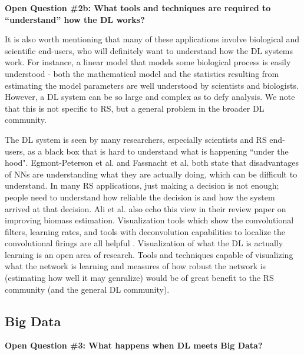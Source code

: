 \documentclass[12pt]{spieman}
\newcommand{\ParSection}[1]{}
\begin{document}
\begin{spacing}{1}
\textbf{Open Question \#2b: What tools and techniques are required to ``understand'' how the DL works?}
\ParSection{Human Understandable}

It is also worth mentioning that many of these applications involve biological and scientific end-users, who will definitely want to understand how the DL systems work. For instance, a linear model that models some biological process is easily understood - both the mathematical model and the statistics resulting from estimating the model parameters are well understood by scientists and biologists. However, a DL system can be so large and complex as to defy analysis. We note that this is not specific to RS, but a general problem in the broader DL community.

The DL system is seen by many researchers, especially scientists and RS end-users, as a black box that is hard to understand what is happening ``under the hood". Egmont-Peterson et al. \cite{Egmont-Petersen2002} and Fassnacht et al. \cite{fassnacht2016review} both state that disadvantages of NNs are understanding what they are actually doing, which can be difficult to understand. In many RS applications, just making a decision is not enough; people need to understand how reliable the decision is and how the system arrived at that decision. Ali et al. \cite{Ali2015} also echo this view in their review paper on improving biomass estimation. Visualization tools which show the convolutional filters, learning rates, and tools with deconvolution capabilities to localize the convolutional firings are all helpful \cite{mahendran2015understanding, yosinski2015understanding, zeiler2014visualizing, simonyan2013deep, erhan2009visualizing} . Visualization of what the DL is actually learning is an open area of research. Tools and techniques capable of visualizing what the network is learning and measures of how robust the network is (estimating how well it may genralize) would be of great benefit to the RS community (and the general DL community).


\subsection{Big Data}
\label{subsec:ChallengesOpportunities_iii}
\textbf{Open Question \#3: What happens when DL meets Big Data?}


\end{spacing}
\end{document}
